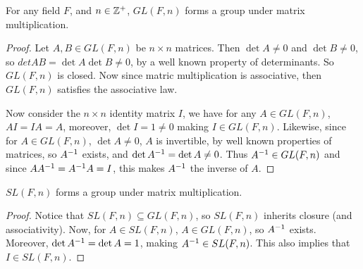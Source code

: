 \begin{theorem}\label{theorem_1.4.1}
  For any field $F$, and  $n \in \mathbb{Z}^+$,  $GL(F,n)$ forms a group under matrix
  multiplication.
\end{theorem}
\begin{proof}
  Let $A,B \in GL(F,n)$ be $n \times n$ matrices. Then  $\det{A} \neq 0$ and
  $\det{B} \neq 0$, so $det{AB}=\det{A}\det{B} \neq 0$, by a well known
  property of determinants. So $GL(F,n)$ is closed. Now since matric
  multiplication is associative, then  $GL(F,n)$ satisfies the associative
  law.

  Now consider the $n \times n$ identity matrix $I$, we have for any $A \in
  GL(F,n)$, $AI=IA=A$, moreover,  $\det{I}=1 \neq 0$ making $I \in GL(F,n)$.
  Likewise, since for $A \in GL(F,n)$, $\det{A} \neq 0$, $A$ is invertible, by
  well known properties of matrices, so  $A^{-1}$ exists, and
  $\det{A^{-1}}=\det{A} \neq 0$. Thus $A^{-1} \in GL(F,n)$ and since
  $AA^{-1}=A^{-1}A=I$, this makes $A^{-1}$ the inverse of $A$.
\end{proof}
\begin{corollary}
  $SL(F,n)$ forms a group under matrix multiplication.
\end{corollary}
\begin{proof}
  Notice that $SL(F,n) \subseteq GL(F,n)$, so $SL(F,n)$ inherits closure (and
  associativity). Now, for $A \in SL(F,n)$, $A \in GL(F,n)$, so $A^{-1}$
  exists. Moreover, $\det{A^{-1}}=\det{A}=1$, making $A^{-1} \in SL(F,n)$.
  This also implies that $I \in SL(F,n)$.
\end{proof}

